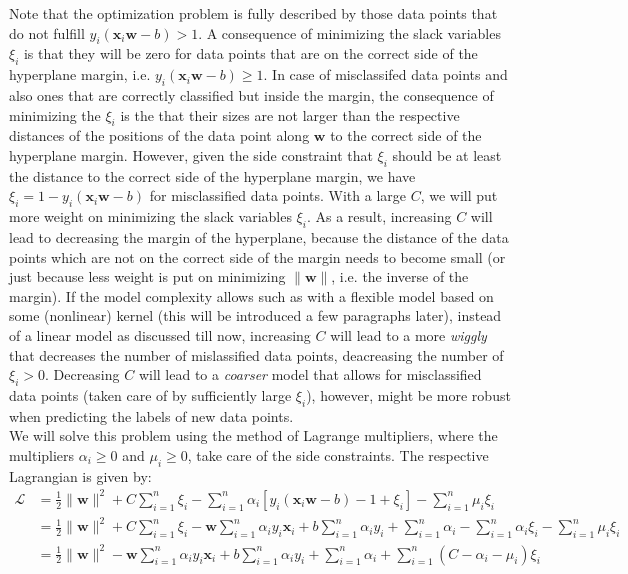 \documentclass[11pt, a4paper, parskip=half*, bibliography=totoc, cleardoublepage=empty, final,
numbers=noenddot]{scrbook}
\begin{document}
Note that the optimization problem is fully described by those data points that do not fulfill $y_i(\bm{x}_i \bm{w} - b) > 1$. A consequence of minimizing the slack variables $\xi_i$ is that they will be zero for data points that are on the correct side of the hyperplane margin, i.e. $y_i(\bm{x}_i \bm{w} - b) \geq 1$. In case of misclassifed data points and also ones that are correctly classified but inside the margin, the consequence of minimizing the $\xi_i$ is the that their sizes are not larger than the respective distances of the positions of the data point along $\bm{w}$ to the correct side of the hyperplane margin. However, given the side constraint that $\xi_i$ should be at least the distance to the correct side of the hyperplane margin, we have $\xi_i = 1 - y_i(\bm{x}_i \bm{w} - b) $ for misclassified data points. With a large $C$, we will put more weight on minimizing the slack variables $\xi_i$. As a result, increasing $C$ will lead to decreasing the margin of the hyperplane, because the distance of the data points which are not on the correct side of the margin needs to become small (or just because less weight is put on minimizing $\| \bm{w} \|$, i.e. the inverse of the margin). If the model complexity allows such as with a flexible model based on some (nonlinear) kernel (this will be introduced a few paragraphs later), instead of a linear model as discussed till now, increasing $C$ will lead to a more \textit{wiggly} that decreases the number of mislassified data points, deacreasing the number of $\xi_i>0$. Decreasing $C$ will lead to a \textit{coarser} model that allows for misclassified data points (taken care of by sufficiently large $\xi_i$), however, might be more robust when predicting the labels of new data points. \\
We will solve this problem using the method of Lagrange multipliers, where the multipliers $\alpha_i \geq 0$ and $\mu_i \geq 0$, take care of the side constraints. The respective Lagrangian is given by:
\begin{align}
\mathcal{L} &= \frac{1}{2} \| \bm{w} \|^2 + C \sum_{i=1}^n \xi_i - \sum_{i=1}^n \alpha_i[ y_i(\bm{x}_i \bm{w} - b) -1 + \xi_i] - \sum_{i=1}^n \mu_i \xi_i \label{eq:first}\\ 
&= \frac{1}{2} \| \bm{w} \|^2 + C \sum_{i=1}^n \xi_i - \bm{w} \sum_{i=1}^n \alpha_i y_i \bm{x}_i  + b \sum_{i=1}^n \alpha_i y_i + \sum_{i=1}^n \alpha_i - \sum_{i=1}^n \alpha_i \xi_i - \sum_{i=1}^n \mu_i \xi_i \\
&= \frac{1}{2} \| \bm{w} \|^2 - \bm{w} \sum_{i=1}^n \alpha_i y_i \bm{x}_i  + b \sum_{i=1}^n \alpha_i y_i+ \sum_{i=1}^n \alpha_i + \sum_{i=1}^n (C - \alpha_i - \mu_i) \xi_i
\label{eq:svm-lagrangian-primary}
\end{align}
\end{document}
